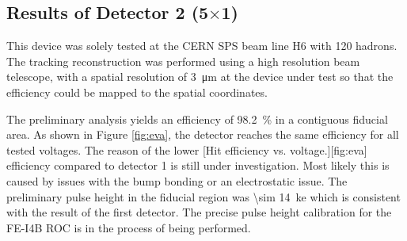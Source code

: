 \subsection{Results of Detector 2 (5$\times$1)}
This device was solely tested at the CERN SPS beam line H6 with \SI{120}{\gev} hadrons. The tracking reconstruction was performed using a high resolution beam telescope, with a spatial resolution of \SI{3}{\micro\meter} at the device under test so that the efficiency could be mapped to the spatial coordinates. \par
The preliminary analysis yields an efficiency of \SI{98.2}{\%} in a contiguous fiducial area. As shown in Figure \ref{fig:eva}, the detector reaches the same efficiency for all tested voltages. %
The reason of the lower 
[Hit efficiency vs. voltage.][fig:eva]
efficiency compared to detector 1 is still under investigation. Most likely this is caused by issues with the bump bonding or an electrostatic issue. The preliminary pulse height in the fiducial region was \SI{\sim 14}{\kilo e} which is consistent with the result of the first detector. The precise pulse height calibration for the FE-I4B \ac{ROC} is in the process of being performed.
